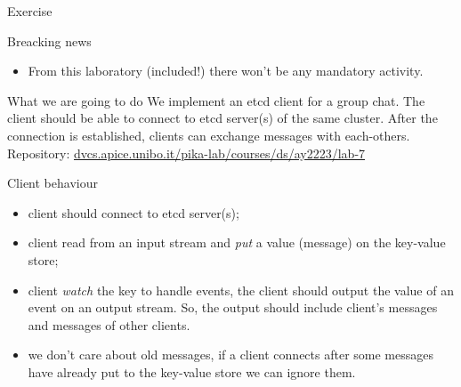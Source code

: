 \documentclass[presentation]{beamer}\mode<presentation>{\usetheme{AMSBolognaFC}}
\begin{document}
\begin{frame}[allowframebreaks]{Exercise}
    
    \begin{block}{Breacking news}
        \begin{itemize}
            \item From this laboratory (included!) there won't be any mandatory activity.
        \end{itemize}
    \end{block}
    \begin{block}{What we are going to do}
        We implement an etcd client for a group chat.
        The client should be able to connect to etcd server(s) of the same cluster.
        After the connection is established, clients can exchange messages with each-others.\\
        Repository: \alert{\href{https://dvcs.apice.unibo.it/pika-lab/courses/ds/ay2223/lab-7}{dvcs.apice.unibo.it/pika-lab/courses/ds/ay2223/lab-7}}
    \end{block}

    \framebreak
    
    \begin{block}{Client behaviour}
        \begin{itemize}
            \item client should connect to etcd server(s);
            \item client read from an input stream and \emph{put} a value (message) on the key-value store;
            \item client \emph{watch} the key to handle events, the client should output the value of an event on an output stream.
            So, the output should include client's messages and messages of other clients.
            \item we don't care about old messages, if a client connects after some messages have already put to the key-value store we can ignore them.
        \end{itemize}
    \end{block}
\end{frame}


\section*{}
\end{document}
